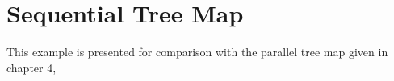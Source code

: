 \section{Sequential Tree Map}

This example is presented for comparison with the parallel tree map given in
chapter 4,
